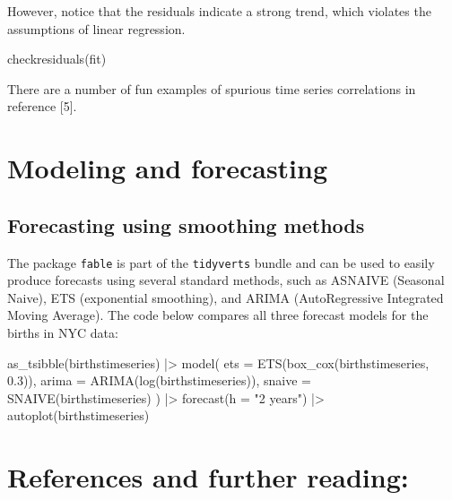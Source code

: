 \documentclass[
  letterpaper,
  DIV=11,
  numbers=noendperiod]{scrreprt}
\newenvironment{Shaded}{\begin{snugshade}}{\end{snugshade}}
\newcommand{\NormalTok}[1]{\textcolor[rgb]{0.00,0.23,0.31}{#1}}
\begin{document}
However, notice that the residuals indicate a strong trend, which
violates the assumptions of linear regression.

\begin{Shaded}
\begin{Highlighting}[]
\NormalTok{checkresiduals(fit)}
\end{Highlighting}
\end{Shaded}

There are a number of fun examples of spurious time series correlations
in reference {[}5{]}.

\section{Modeling and forecasting}\label{modeling-and-forecasting}

\subsection{Forecasting using smoothing
methods}\label{forecasting-using-smoothing-methods}

The package \texttt{fable} is part of the \texttt{tidyverts} bundle and
can be used to easily produce forecasts using several standard methods,
such as ASNAIVE (Seasonal Naive), ETS (exponential smoothing), and ARIMA
(AutoRegressive Integrated Moving Average). The code below compares all
three forecast models for the births in NYC data:

\begin{Shaded}
\begin{Highlighting}[]
\NormalTok{as\_tsibble(birthstimeseries) |\textgreater{} }
\NormalTok{  model(}
\NormalTok{    ets = ETS(box\_cox(birthstimeseries, 0.3)),}
\NormalTok{   arima = ARIMA(log(birthstimeseries)),}
\NormalTok{    snaive = SNAIVE(birthstimeseries)}
\NormalTok{  ) |\textgreater{}}
\NormalTok{  forecast(h = "2 years") |\textgreater{} }
\NormalTok{  autoplot(birthstimeseries)}
\end{Highlighting}
\end{Shaded}

\section{References and further
reading:}\label{references-and-further-reading-1}
\end{document}
